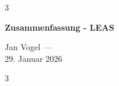 \documentclass[9pt]{extarticle}
\newcommand{\doctitle}{Zusammenfassung - LEAS}
\newcommand{\docauthors}{Jan Vogel}
\newcommand{\docdate}{29. Januar 2026}
\begin{document}
\begin{multicols*}{3}
  {\centering
   {\Large\bfseries \doctitle\par}\vspace{4pt}
   {\normalsize \docauthors\ ---\\ \docdate\par}}
  \vspace{10pt}
  \tableofcontents
\end{multicols*}
\newpage

\begin{multicols*}{3}
  
  
  
  
  
  
  
  
\end{multicols*}
\end{document}
